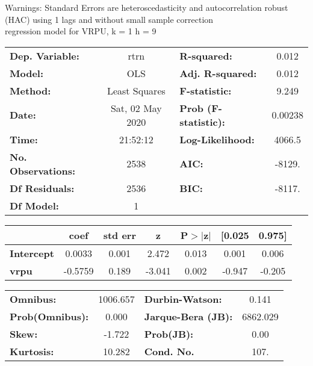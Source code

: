 Warnings: \newline
 [1] Standard Errors are heteroscedasticity and autocorrelation robust (HAC) using 1 lags and without small sample correction\\ 

regression model for VRPU, k = 1 h = 9\begin{center}
\begin{tabular}{lclc}
\toprule
\textbf{Dep. Variable:}    &       rtrn       & \textbf{  R-squared:         } &     0.012   \\
\textbf{Model:}            &       OLS        & \textbf{  Adj. R-squared:    } &     0.012   \\
\textbf{Method:}           &  Least Squares   & \textbf{  F-statistic:       } &     9.249   \\
\textbf{Date:}             & Sat, 02 May 2020 & \textbf{  Prob (F-statistic):} &  0.00238    \\
\textbf{Time:}             &     21:52:12     & \textbf{  Log-Likelihood:    } &    4066.5   \\
\textbf{No. Observations:} &        2538      & \textbf{  AIC:               } &    -8129.   \\
\textbf{Df Residuals:}     &        2536      & \textbf{  BIC:               } &    -8117.   \\
\textbf{Df Model:}         &           1      & \textbf{                     } &             \\
\bottomrule
\end{tabular}
\begin{tabular}{lcccccc}
                   & \textbf{coef} & \textbf{std err} & \textbf{z} & \textbf{P$> |$z$|$} & \textbf{[0.025} & \textbf{0.975]}  \\
\midrule
\textbf{Intercept} &       0.0033  &        0.001     &     2.472  &         0.013        &        0.001    &        0.006     \\
\textbf{vrpu}      &      -0.5759  &        0.189     &    -3.041  &         0.002        &       -0.947    &       -0.205     \\
\bottomrule
\end{tabular}
\begin{tabular}{lclc}
\textbf{Omnibus:}       & 1006.657 & \textbf{  Durbin-Watson:     } &    0.141  \\
\textbf{Prob(Omnibus):} &   0.000  & \textbf{  Jarque-Bera (JB):  } & 6862.029  \\
\textbf{Skew:}          &  -1.722  & \textbf{  Prob(JB):          } &     0.00  \\
\textbf{Kurtosis:}      &  10.282  & \textbf{  Cond. No.          } &     107.  \\
\bottomrule
\end{tabular}
\end{center}

